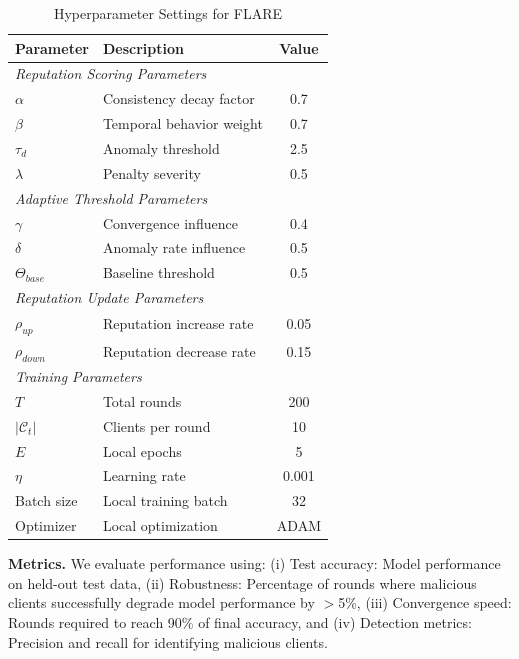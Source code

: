 \documentclass[lettersize,journal]{IEEEtran}
\begin{document}
{\begin{table}
\centering
\scriptsize
\setlength{\extrarowheight}{0pt}
\setlength{\aboverulesep}{0pt}
\setlength{\belowrulesep}{0pt}
\caption{Hyperparameter Settings for FLARE}
\label{tab:hyperparameters}
\begin{tabular}{llc} 
\toprule
\rowcolor[rgb]{0.816,0.816,0.816} \textbf{Parameter} & \textbf{Description} & \textbf{Value} \\ 
\midrule
\multicolumn{3}{l}{\textit{Reputation Scoring Parameters}} \\ 
\hdashline
$\alpha$ & Consistency decay factor & 0.7 \\
$\beta$ & Temporal behavior weight & 0.7 \\
$\tau_d$ & Anomaly threshold & 2.5 \\
$\lambda$ & Penalty severity & 0.5 \\ 
\midrule
\multicolumn{3}{l}{\textit{Adaptive Threshold Parameters}} \\ 
\hdashline
$\gamma$ & Convergence influence & 0.4 \\
$\delta$ & Anomaly rate influence & 0.5 \\
$\Theta_{base}$ & Baseline threshold & 0.5 \\ 
\midrule
\multicolumn{3}{l}{\textit{Reputation Update Parameters}} \\ 
\hdashline
$\rho_{up}$ & Reputation increase rate & 0.05 \\
$\rho_{down}$ & Reputation decrease rate & 0.15 \\
\midrule
\multicolumn{3}{l}{\textit{Training Parameters}} \\ 
\hdashline
$T$ & Total rounds & 200 \\
$|\mathcal{C}_t|$ & Clients per round & 10 \\
$E$ & Local epochs & 5 \\
$\eta$ & Learning rate & 0.001 \\
Batch size & Local training batch & 32 \\
Optimizer & Local optimization & ADAM \\
\bottomrule
\end{tabular}
\end{table}


\textbf{Metrics.} We evaluate performance using: (i) Test accuracy: Model performance on held-out test data, (ii) Robustness: Percentage of rounds where malicious clients successfully degrade model performance by $>$5\%, (iii) Convergence speed: Rounds required to reach 90\% of final accuracy, and (iv) Detection metrics: Precision and recall for identifying malicious clients.



}
\end{document}
